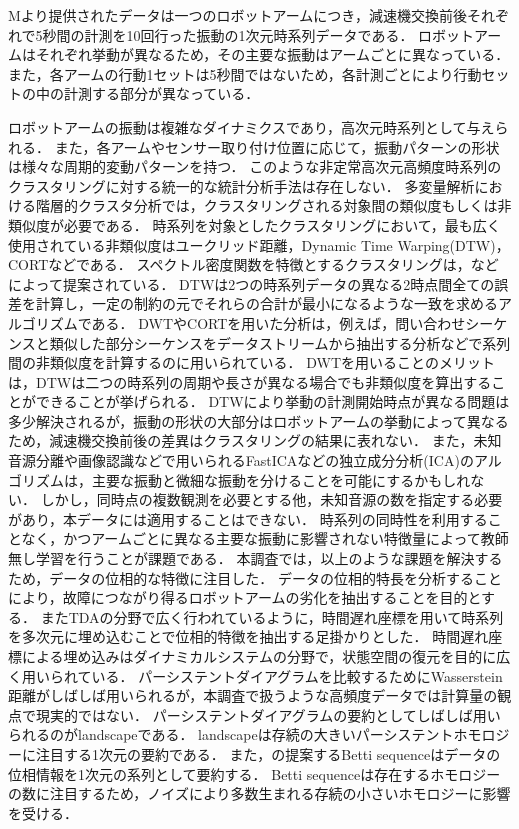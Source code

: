 \documentclass{jarticle}
\begin{document}
Mより提供されたデータは一つのロボットアームにつき，減速機交換前後それぞれで5秒間の計測を10回行った振動の1次元時系列データである．
ロボットアームはそれぞれ挙動が異なるため，その主要な振動はアームごとに異なっている．
また，各アームの行動1セットは5秒間ではないため，各計測ごとにより行動セットの中の計測する部分が異なっている．

ロボットアームの振動は複雑なダイナミクスであり，高次元時系列として与えられる．
また，各アームやセンサー取り付け位置に応じて，振動パターンの形状は様々な周期的変動パターンを持つ．
このような非定常高次元高頻度時系列のクラスタリングに対する統一的な統計分析手法は存在しない．
多変量解析における階層的クラスタ分析では，クラスタリングされる対象間の類似度もしくは非類似度が必要である．
時系列を対象としたクラスタリングにおいて，最も広く使用されている非類似度はユークリッド距離，Dynamic Time Warping(DTW)\cite{Berndt1996}，CORT\cite{Chouakria2007}などである．
スペクトル密度関数を特徴とするクラスタリングは，\cite{Garcia2017}などによって提案されている．
DTWは2つの時系列データの異なる2時点間全ての誤差を計算し，一定の制約の元でそれらの合計が最小になるような一致を求めるアルゴリズムである．
DWTやCORTを用いた分析は，例えば，問い合わせシーケンスと類似した部分シーケンスをデータストリームから抽出する分析などで系列間の非類似度を計算するのに用いられている\cite{Sakurai2007}．
DWTを用いることのメリットは，DTWは二つの時系列の周期や長さが異なる場合でも非類似度を算出することができることが挙げられる．
DTWにより挙動の計測開始時点が異なる問題は多少解決されるが，振動の形状の大部分はロボットアームの挙動によって異なるため，減速機交換前後の差異はクラスタリングの結果に表れない．
また，未知音源分離や画像認識などで用いられるFastICA\cite{Hyvarinen2000}などの独立成分分析(ICA)のアルゴリズムは，主要な振動と微細な振動を分けることを可能にするかもしれない．
しかし，同時点の複数観測を必要とする他，未知音源の数を指定する必要があり，本データには適用することはできない．
時系列の同時性を利用することなく，かつアームごとに異なる主要な振動に影響されない特徴量によって教師無し学習を行うことが課題である．
本調査では，以上のような課題を解決するため，データの位相的な特徴に注目した．
データの位相的特長を分析することにより，故障につながり得るロボットアームの劣化を抽出することを目的とする．
またTDAの分野で広く行われているように，時間遅れ座標を用いて時系列を多次元に埋め込むことで位相的特徴を抽出する足掛かりとした．
時間遅れ座標による埋め込みはダイナミカルシステムの分野で，状態空間の復元を目的に広く用いられている．
パーシステントダイアグラムを比較するためにWasserstein距離\cite{Mileyko2011}がしばしば用いられるが，本調査で扱うような高頻度データでは計算量の観点で現実的ではない．
パーシステントダイアグラムの要約としてしばしば用いられるのがlandscape\cite{Bubenik2015}である．
landscapeは存続の大きいパーシステントホモロジーに注目する1次元の要約である．
また，\cite{Umeda2017}の提案するBetti sequenceはデータの位相情報を1次元の系列として要約する．
Betti sequenceは存在するホモロジーの数に注目するため，ノイズにより多数生まれる存続の小さいホモロジーに影響を受ける．
\end{document}

